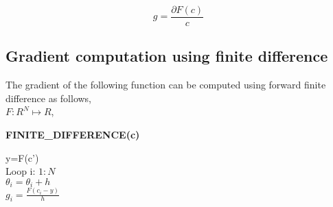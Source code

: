 \documentclass[10pt,a4paper]{report}
\begin{document}
\begin{equation}
g=\frac{\partial F(c)}{c}
\end{equation}       
%
%
%
     
\subsection{Gradient computation using finite difference}

The gradient of the following function can be computed using forward finite difference as follows,\\
$F:R^{N} \mapsto R$,
\begin{algorithm}[h]
\caption{\textbf{FINITE\_DIFFERENCE(c)}}
  y=F(c')\\
  Loop i: $1:N$\\
  \Indp $\theta_i = \theta_i +h$\\
  $g_{i} = \frac{F(c_{i}-y)}{h}$
  
\end{algorithm}
\end{document}
